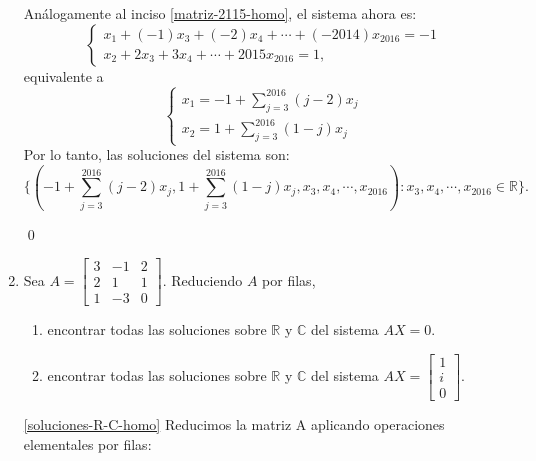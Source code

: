 \begin{enumerate}[topsep=6pt, itemsep=.4cm]
Análogamente al inciso \ref{matriz-2115-homo}, el sistema ahora es:
\begin{equation*}
\begin{cases}
x_1 + (-1)x_3 + (-2)x_4 + \cdots + (-2014)x_{2016} = -1\\
x_2 + 2 x_3 + 3 x_4 + \cdots + 2015 x_{2016} = 1,
\end{cases}
\end{equation*}
equivalente a
\begin{equation*}
\begin{cases}
x_1 = -1 + \sum_{j=3}^{2016} (j-2) x_j \\
x_2 = 1 + \sum_{j=3}^{2016} (1-j) x_j
\end{cases}
\end{equation*}
Por lo tanto,  las soluciones del sistema son:
$$\{ ( -1+\sum_{j=3}^{2016} (j-2) x_j , 1+\sum_{j=3}^{2016} (1-j) x_j , x_3 , x_4, \cdots, x_{2016}) : x_3,x_4,\cdots, x_{2016} \in \mathbb R \}.$$


\qed

     \item Sea $A=\begin{bmatrix}3 & -1 & 2 \\2 & 1 & 1 \\1&-3&0\end{bmatrix}$. Reduciendo $A$ por filas,
        \begin{enumerate}
        \item\label{soluciones-R-C-homo} encontrar todas las soluciones sobre $\mathbb{R}$ y $\mathbb{C}$ del sistema $AX=0$.
        \item\label{soluciones-R-C-no-homo} encontrar todas las soluciones sobre $\mathbb{R}$ y $\mathbb{C}$ del sistema $AX=\left[\begin{array}{c}
            1\\i\\0 \end{array}\right]$.
        \end{enumerate}

 \rta


\ref{soluciones-R-C-homo} Reducimos la matriz A aplicando operaciones elementales por filas:


\end{enumerate}
